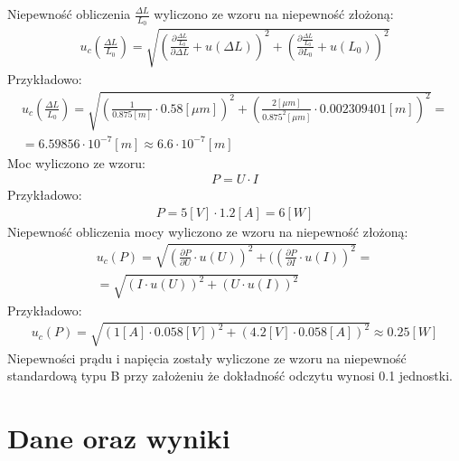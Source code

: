 \documentclass[11pt]{article}
\begin{document}
    \noindent Niepewność obliczenia $\frac{\Delta L}{L_0}$ wyliczono ze wzoru na niepewność złożoną:
    \begin{gather*}
        u_c(\frac{\Delta L}{L_0})=\sqrt{(\frac{\partial \frac{\Delta L}{L_0}}{\partial \Delta L}+u(\Delta L))^2+(\frac{\partial \frac{\Delta L}{L_0}}{\partial L_0}+u(L_0))^2}
    \end{gather*}
    \noindent Przykładowo:
    \begin{gather*}
        u_c(\frac{\Delta L}{L_0})=\sqrt{(\frac{1}{0.875 [m]}\cdot 0.58[\mu m])^2+(\frac{2[\mu m]}{0.875^2[\mu m]}\cdot 0.002309401[m])^2}=\\
        =6.59856\cdot 10^{-7} [m]\approx 6.6\cdot 10^{-7} [m]
    \end{gather*}
    \noindent Moc wyliczono ze wzoru:
    \begin{gather*}
        P=U\cdot I
    \end{gather*}
    \noindent Przykładowo:
    \begin{gather*}
        P=5[V]\cdot 1.2[A]=6[W]
    \end{gather*}
    \noindent Niepewność obliczenia mocy wyliczono ze wzoru na niepewność złożoną:
    \begin{gather*}
        u_c(P)=\sqrt{(\frac{\partial P}{\partial U}\cdot u(U))^2+((\frac{\partial P}{\partial I}\cdot u(I))^2}=\\
        =\sqrt{(I\cdot u(U))^2+(U\cdot u(I))^2}
    \end{gather*}
    \noindent Przykładowo:
    \begin{gather*}
        u_c(P)=\sqrt{(1[A]\cdot 0.058[V])^2+(4.2[V]\cdot 0.058[A])^2}\approx 0.25 [W]
    \end{gather*}
    \noindent Niepewności prądu i napięcia zostały wyliczone ze wzoru na niepewność standardową typu B przy założeniu że dokładność odczytu wynosi 0.1 jednostki.

    \section{Dane oraz wyniki}
\end{document}
